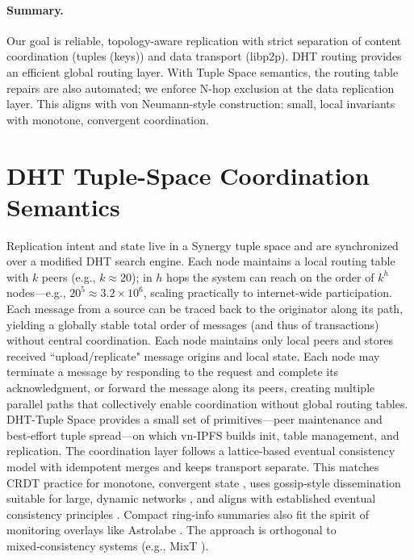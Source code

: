 \documentclass[runningheads]{llncs}
\begin{document}
\paragraph{Summary.}
Our goal is reliable, topology-aware replication with strict separation of content coordination (tuples (keys)) and data transport (libp2p). DHT routing provides an efficient global routing layer. With Tuple Space semantics, the routing table repairs are also automated; we enforce N-hop exclusion at the data replication layer. This aligns with von Neumann-style construction: small, local invariants with monotone, convergent coordination.

\section{DHT Tuple-Space Coordination Semantics}
Replication intent and state live in a Synergy tuple space and are synchronized over a modified DHT search engine. Each node maintains a local routing table with $k$ peers (e.g., $k\approx 20$); in $h$ hops the system can reach on the order of $k^h$ nodes—e.g., $20^5 \approx 3.2\times 10^6$, scaling practically to internet-wide participation. Each message from a source can be traced back to the originator along its path, yielding a globally stable total order of messages (and thus of transactions) without central coordination. Each node maintains only local peers and stores received ``upload/replicate" message origins and local state. Each node may terminate a message by responding to the request and complete its acknowledgment, or forward the message along its peers, creating multiple parallel paths that collectively enable coordination without global routing tables. DHT-Tuple Space provides a small set of primitives—peer maintenance and best‑effort tuple spread—on which vn‑IPFS builds init, table management, and replication. The coordination layer follows a lattice‑based eventual consistency model with idempotent merges and keeps transport separate. This matches CRDT practice for monotone, convergent state \cite{ShapiroCRDT2011,BaqueroPureOpCRDT2017}, uses gossip‑style dissemination suitable for large, dynamic networks \cite{Jelasity2005Gossip}, and aligns with established eventual consistency principles \cite{Burckhardt2014EC}. Compact ring‑info summaries also fit the spirit of monitoring overlays like Astrolabe \cite{Astrolabe2003}. The approach is orthogonal to mixed‑consistency systems (e.g., MixT \cite{MilanoMyersMixT2018}).
\end{document}
